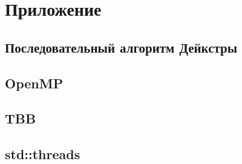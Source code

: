 \documentclass{article}
\begin{document}
\newpage

\section{Приложение}
\subsection{Последовательный алгоритм Дейкстры}




\subsection{OpenMP}




\subsection{TBB}




\subsection{std::threads}



\end{document}
